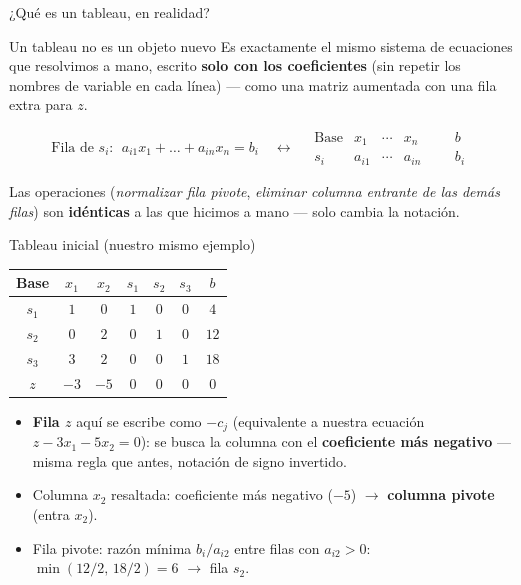 \documentclass[aspectratio=169]{beamer}
\begin{document}
\begin{frame}{¿Qué es un tableau, en realidad?}
\begin{block}{Un tableau no es un objeto nuevo}
Es exactamente el mismo sistema de ecuaciones que resolvimos a mano, escrito \textbf{solo con los coeficientes} (sin repetir los nombres de variable en cada línea) --- como una matriz aumentada con una fila extra para $z$.
\end{block}

\[
\text{Fila de }s_i:\ \ a_{i1}x_1+\dots+a_{in}x_n = b_i
\quad\longleftrightarrow\quad
\begin{array}{c|ccccc|c}
\text{Base} & x_1 & \cdots & x_n & & & b\\\hline
s_i & a_{i1} & \cdots & a_{in} & & & b_i
\end{array}
\]

Las operaciones (\emph{normalizar fila pivote}, \emph{eliminar columna entrante de las demás filas}) son \textbf{idénticas} a las que hicimos a mano --- solo cambia la notación.
\end{frame}

\begin{frame}{Tableau inicial (nuestro mismo ejemplo)}
\begin{center}
\renewcommand{\arraystretch}{1.3}
\begin{tabular}{c|ccccc|c}
\textbf{Base} & $x_1$ & $x_2$ & $s_1$ & $s_2$ & $s_3$ & $b$ \\
\hline
$s_1$ & $1$ & $0$ & $1$ & $0$ & $0$ & $4$ \\
$s_2$ & $0$ & \cellcolor{entra!20}$2$ & $0$ & $1$ & $0$ & $12$ \\
$s_3$ & $3$ & $2$ & $0$ & $0$ & $1$ & $18$ \\
\hline
$z$ & $-3$ & \cellcolor{entra!20}$-5$ & $0$ & $0$ & $0$ & $0$ \\
\end{tabular}
\end{center}

\begin{itemize}
\item \textbf{Fila $z$} aquí se escribe como $-c_j$ (equivalente a nuestra ecuación $z-3x_1-5x_2=0$): se busca la columna con el \textbf{coeficiente más negativo} --- misma regla que antes, notación de signo invertido.
\item Columna $x_2$ resaltada: coeficiente más negativo ($-5$) $\to$ \textbf{columna pivote} (entra $x_2$).
\item Fila pivote: razón mínima $b_i/a_{i2}$ entre filas con $a_{i2}>0$: $\min(12/2,\,18/2)=6$ $\to$ fila $s_2$.
\end{itemize}
\end{frame}
\end{document}
